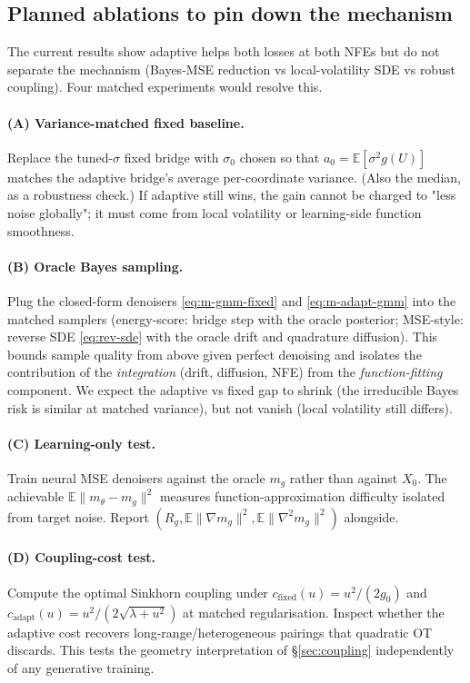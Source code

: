 \documentclass[11pt]{article}
\newcommand{\E}{\mathbb{E}}
\begin{document}
\subsection{Planned ablations to pin down the mechanism}
\label{sec:ablations}

The current results show adaptive helps both losses at both NFEs but
do not separate the mechanism (Bayes-MSE reduction vs local-volatility
SDE vs robust coupling). Four matched experiments would resolve this.

\paragraph{(A) Variance-matched fixed baseline.} Replace the tuned-$\sigma$
fixed bridge with $\sigma_0$ chosen so that $a_0 = \E[\sigma^2 g(U)]$
matches the adaptive bridge's average per-coordinate variance. (Also
the median, as a robustness check.) If adaptive still wins, the gain
cannot be charged to "less noise globally"; it must come from local
volatility or learning-side function smoothness.

\paragraph{(B) Oracle Bayes sampling.} Plug the closed-form denoisers
\eqref{eq:m-gmm-fixed} and \eqref{eq:m-adapt-gmm} into the matched
samplers (energy-score: bridge step with the oracle posterior;
MSE-style: reverse SDE \eqref{eq:rev-sde} with the oracle drift and
quadrature diffusion). This bounds sample quality from above given
perfect denoising and isolates the contribution of the
\emph{integration} (drift, diffusion, NFE) from the
\emph{function-fitting} component. We expect the adaptive vs fixed gap
to shrink (the irreducible Bayes risk is similar at matched variance),
but not vanish (local volatility still differs).

\paragraph{(C) Learning-only test.} Train neural MSE denoisers
against the oracle $m_g$ rather than against $X_0$. The achievable
$\E\|m_\theta - m_g\|^2$ measures function-approximation difficulty
isolated from target noise. Report
$(R_g, \E\|\nabla m_g\|^2, \E\|\nabla^2 m_g\|^2)$ alongside.

\paragraph{(D) Coupling-cost test.} Compute the optimal Sinkhorn
coupling under $c_{\text{fixed}}(u) = u^2/(2 g_0)$ and
$c_{\text{adapt}}(u) = u^2/(2\sqrt{\lambda + u^2})$ at matched
regularisation. Inspect whether the adaptive cost recovers
long-range/heterogeneous pairings that quadratic OT discards. This
tests the geometry interpretation of \S\ref{sec:coupling}
independently of any generative training.
\end{document}
